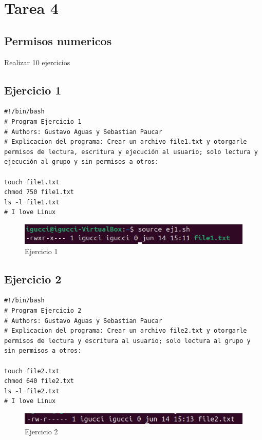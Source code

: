 \documentclass[11pt,twoside]{book}
\begin{document}
\newpage
\section{Tarea 4}
\subsection{Permisos numericos}
Realizar 10 ejercicios
\subsection{Ejercicio 1}
\begin{lstlisting}
#!/bin/bash
# Program Ejercicio 1
# Authors: Gustavo Aguas y Sebastian Paucar
# Explicacion del programa: Crear un archivo file1.txt y otorgarle permisos de lectura, escritura y ejecución al usuario; solo lectura y ejecución al grupo y sin permisos a otros:

touch file1.txt
chmod 750 file1.txt
ls -l file1.txt
# I love Linux
\end{lstlisting}
\begin{figure}
    \centering
    \includegraphics[width=1\linewidth]{pnum/ej1.png}
    \caption{Ejercicio 1}
\end{figure}

\newpage
\subsection{Ejercicio 2}
\begin{lstlisting}
#!/bin/bash
# Program Ejercicio 2
# Authors: Gustavo Aguas y Sebastian Paucar
# Explicacion del programa: Crear un archivo file2.txt y otorgarle permisos de lectura y escritura al usuario; solo lectura al grupo y sin permisos a otros:

touch file2.txt
chmod 640 file2.txt
ls -l file2.txt
# I love Linux
\end{lstlisting}
\begin{figure}
    \centering
    \includegraphics[width=1\linewidth]{pnum/ej2.png}
    \caption{Ejercicio 2}
\end{figure}
\newpage
\end{document}
